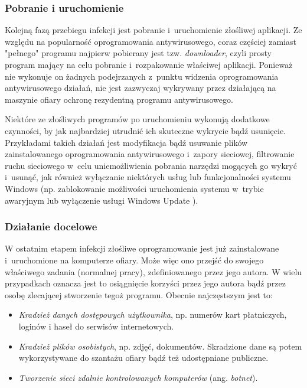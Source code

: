 \documentclass[a4paper,12pt,oneside]{article}
\begin{document}
	\subsubsection{Pobranie i uruchomienie}
	
	Kolejną fazą przebiegu infekcji jest pobranie i~uruchomienie złośliwej aplikacji. Ze względu na popularność oprogramowania antywirusowego, coraz częściej zamiast "pełnego" programu najpierw pobierany jest tzw. \textit{downloader}, czyli prosty program mający na celu pobranie i~rozpakowanie właściwej aplikacji. Ponieważ nie wykonuje on żadnych podejrzanych z~punktu widzenia oprogramowania antywirusowego działań, nie jest zazwyczaj wykrywany przez działającą na maszynie ofiary ochronę rezydentną programu antywirusowego.
	
	Niektóre ze złośliwych programów po uruchomieniu wykonują dodatkowe czynności, by jak najbardziej utrudnić ich skuteczne wykrycie bądź usunięcie. Przykładami takich działań jest modyfikacja bądź usuwanie plików zainstalowanego oprogramowania antywirusowego i~zapory sieciowej, filtrowanie ruchu sieciowego w~celu uniemożliwienia pobrania narzędzi mogących go wykryć i~usunąć, jak również wyłączanie niektórych usług lub funkcjonalności systemu Windows (np. zablokowanie możliwości uruchomienia systemu w~trybie awaryjnym lub wyłączenie usługi Windows Update \cite{www-virus-winupdate}).
	
	\subsubsection{Działanie docelowe}	
	
	W ostatnim etapem infekcji złośliwe oprogramowanie jest już zainstalowane i~uruchomione na komputerze ofiary. Może więc ono przejść do swojego właściwego zadania (normalnej pracy), zdefiniowanego przez jego autora. W wielu przypadkach oznacza jest to osiągnięcie korzyści przez jego autora bądź przez osobę zlecającej stworzenie tegoż programu. Obecnie najczęstszym jest to:
	
	\begin{itemize}
		\item \emph{Kradzież danych dostępowych użytkownika}, np. numerów kart płatniczych, loginów i haseł do serwisów internetowych. 
		\item \emph{Kradzież plików osobistych}, np. zdjęć, dokumentów. Skradzione dane są potem wykorzystywane do szantażu ofiary bądź też udostępniane publiczne.
		\item \emph{Tworzenie sieci zdalnie kontrolowanych komputerów} (ang. \textit{botnet}).
	\end{itemize}
	
\end{document}
